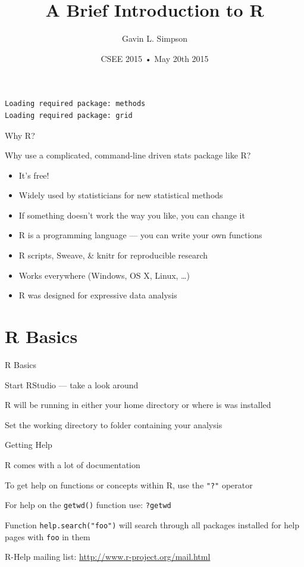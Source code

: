 \documentclass[10pt,ignorenonframetext,compress, aspectratio=169]{beamer}
\title{A Brief Introduction to R}
\author{Gavin L. Simpson}
\date{CSEE 2015 • May 20th 2015}
\begin{document}
\frame{\titlepage}

\begin{frame}[fragile]

\begin{verbatim}
Loading required package: methods
Loading required package: grid
\end{verbatim}

\end{frame}

\begin{frame}{Why R?}

Why use a complicated, command-line driven stats package like R?

\begin{itemize}
\itemsep1pt\parskip0pt
\item
  It's free!
\item
  Widely used by statisticians for new statistical methods
\item
  If something doesn't work the way you like, you can change it
\item
  R is a programming language --- you can write your own functions
\item
  R scripts, \alert{Sweave}, \& \alert{knitr} for reproducible research
\item
  Works everywhere (Windows, OS X, Linux, \ldots{})
\item
  R was designed for expressive data analysis
\end{itemize}

\end{frame}

\section{R Basics}\label{r-basics}

\begin{frame}{R Basics}

Start \alert{RStudio} --- take a look around

R will be running in either your home directory or where is was
installed

Set the working directory to folder containing your analysis

\end{frame}

\begin{frame}{Getting Help}

R comes with a lot of documentation

To get help on functions or concepts within R, use the \texttt{"?"}
operator

For help on the \texttt{getwd()} function use: \texttt{?getwd}

Function \texttt{help.search("foo")} will search through all packages
installed for help pages with \texttt{foo} in them

R-Help mailing list: \url{http://www.r-project.org/mail.html}

\end{frame}
\end{document}
